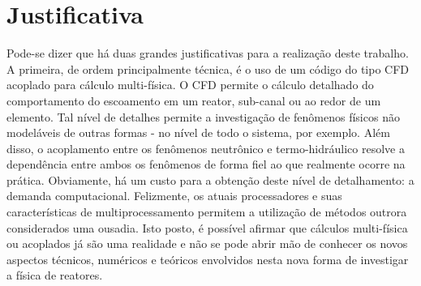 %

\section{Justificativa}

Pode-se dizer que há duas grandes justificativas para a realização deste trabalho. A primeira, de ordem principalmente
técnica, é o uso de um código do tipo CFD acoplado para cálculo multi-física. O CFD permite o cálculo detalhado do
comportamento do escoamento em um reator, sub-canal ou ao redor de um elemento. Tal nível de detalhes permite a
investigação de fenômenos físicos não modeláveis de outras formas - no nível de todo o sistema, por exemplo. Além disso,
o acoplamento entre os fenômenos neutrônico e termo-hidráulico resolve a dependência entre ambos os fenômenos de forma
fiel ao que realmente ocorre na prática. Obviamente, há um custo para a obtenção deste nível de detalhamento: a
demanda computacional. Felizmente, os atuais processadores e suas características de multiprocessamento permitem
a utilização de métodos outrora considerados uma ousadia. Isto posto, é possível afirmar que cálculos multi-física ou
acoplados já são uma realidade e não se pode abrir mão de conhecer os novos aspectos técnicos, numéricos e teóricos
envolvidos nesta nova forma de investigar a física de reatores.

